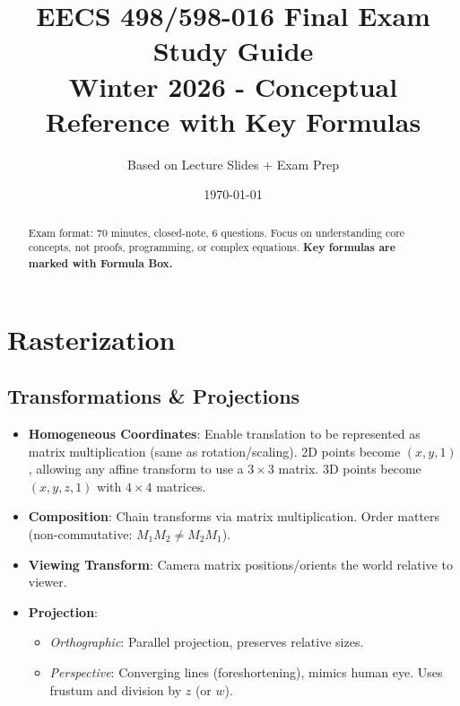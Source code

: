 \documentclass[11pt]{article}
\title{\textbf{EECS 498/598-016 Final Exam Study Guide}\\
\large{Winter 2026 - Conceptual Reference with Key Formulas}}
\author{Based on Lecture Slides + Exam Prep}
\date{\today}
\begin{document}
\maketitle
\vspace{-1em}

\begin{abstract}
\noindent Exam format: 70 minutes, closed-note, 6 questions. Focus on understanding core concepts, not proofs, programming, or complex equations. \textbf{Key formulas are marked with \colorbox{blue!10}{\textcolor{blue!60!black}{Formula Box}}.}
\end{abstract}

\tableofcontents
\newpage

\section{Rasterization}
\subsection{Transformations \& Projections}
\begin{itemize}
    \item \textbf{Homogeneous Coordinates}: Enable translation to be represented as matrix multiplication (same as rotation/scaling). 2D points become $(x, y, 1)$, allowing any affine transform to use a $3\times3$ matrix. 3D points become $(x, y, z, 1)$ with $4\times4$ matrices.
    \item \textbf{Composition}: Chain transforms via matrix multiplication. Order matters (non-commutative: $M_1 M_2 \neq M_2 M_1$).
    \item \textbf{Viewing Transform}: Camera matrix positions/orients the world relative to viewer.
    \item \textbf{Projection}: 
    \begin{itemize}
        \item \textit{Orthographic}: Parallel projection, preserves relative sizes.
        \item \textit{Perspective}: Converging lines (foreshortening), mimics human eye. Uses frustum and division by $z$ (or $w$).
    \end{itemize}
\end{itemize}
\end{document}
